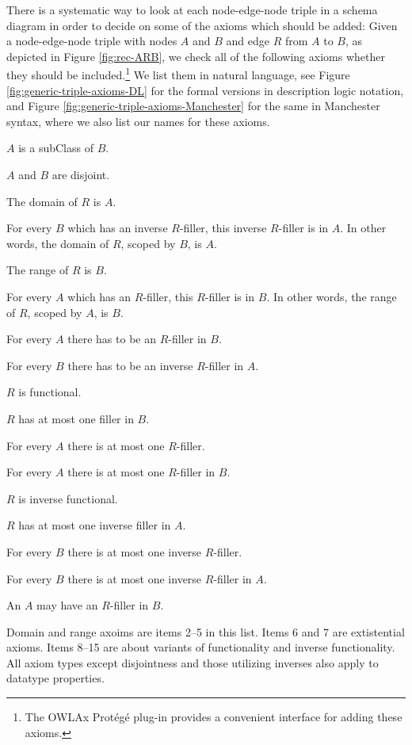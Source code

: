There is a systematic way to look at each node-edge-node triple in a schema diagram in order to decide on some of the axioms which should be added: Given a node-edge-node triple with nodes $A$ and $B$ and edge $R$ from $A$ to $B$, as depicted in Figure \ref{fig:rec-ARB}, we check all of the following axioms whether they should be included.\footnote{The OWLAx Prot\'eg\'e plug-in \cite{SarkerKH16} provides a convenient interface for adding these axioms.} We list them in natural language, see Figure \ref{fig:generic-triple-axioms-DL} for the formal versions in description logic notation, and Figure \ref{fig:generic-triple-axioms-Manchester} for the same in Manchester syntax, where we also list our names for these axioms.
\begin{compactenum}
\item $A$ is a subClass of $B$.
\item $A$ and $B$ are disjoint.
\item The domain of $R$ is $A$.
\item For every $B$ which has an inverse $R$-filler, this inverse $R$-filler is in $A$. In other words, the domain of $R$, scoped by $B$, is $A$.
\item The range of $R$ is $B$.
\item For every $A$ which has an $R$-filler, this $R$-filler is in $B$. In other words, the range of $R$, scoped by $A$, is $B$.
\item For every $A$ there has to be an $R$-filler in $B$.
\item For every $B$ there has to be an inverse $R$-filler in $A$.
\item $R$ is functional.
\item $R$ has at most one filler in $B$.
\item For every $A$ there is at most one $R$-filler.
\item For every $A$ there is at most one $R$-filler in $B$.
\item $R$ is inverse functional.
\item $R$ has at most one inverse filler in $A$.
\item For every $B$ there is at most one inverse $R$-filler.
\item For every $B$ there is at most one inverse $R$-filler in $A$.
\item An $A$ may have an $R$-filler in $B$.
\end{compactenum}

Domain and range axoims are items 2--5 in this list. Items 6 and 7 are extistential axioms. Items 8--15 are about variants of functionality and inverse functionality. All axiom types except disjointness and those utilizing inverses also apply to datatype properties.


